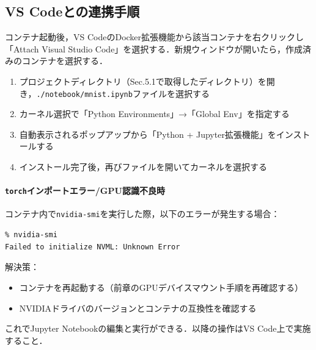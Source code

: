 \subsection{VS Codeとの連携手順}
コンテナ起動後，VS CodeのDocker拡張機能から該当コンテナを右クリックし「Attach Visual Studio Code」を選択する．新規ウィンドウが開いたら，作成済みのコンテナを選択する．

\begin{enumerate}
\item プロジェクトディレクトリ（Sec.5.1で取得したディレクトリ）を開き，\texttt{./notebook/mnist.ipynb}ファイルを選択する
\item カーネル選択で「Python Environments」→「Global Env」を指定する
\item 自動表示されるポップアップから「Python + Jupyter拡張機能」をインストールする
\item インストール完了後，再びファイルを開いてカーネルを選択する
\end{enumerate}

\paragraph{\texttt{torch}インポートエラー/GPU認識不良時}
コンテナ内で\texttt{nvidia-smi}を実行した際，以下のエラーが発生する場合：
\begin{lstlisting}
% nvidia-smi
Failed to initialize NVML: Unknown Error
\end{lstlisting}
解決策：
\begin{itemize}
\item コンテナを再起動する（前章のGPUデバイスマウント手順を再確認する）
\item NVIDIAドライバのバージョンとコンテナの互換性を確認する
\end{itemize}

これでJupyter Notebookの編集と実行ができる．以降の操作はVS Code上で実施すること．